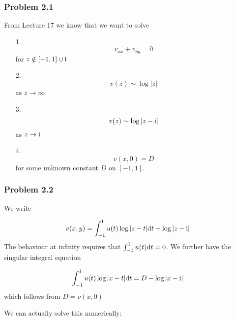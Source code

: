 \documentclass[12pt,a4paper]{article}
\def\D{ {\rm d} }
\def\I{ {\rm i} }
\def\dt{\D t}
\begin{document}
\subsubsection{Problem 2.1}
From Lecture 17 we know that we want to solve

\begin{itemize}
\item[1. ] \[
v_{xx} + v_{yy} =0
\]
for $z \notin [-1,1] \cup \I$


\item[2. ] \[
v(z) \sim \log|z|
\]
as $z \rightarrow \infty$


\item[3. ] \[
v(z) \sim \log|z-\I|
\]
as $z \rightarrow \I$


\item[4. ] \[
v(x,0) = D
\]
for some unknown constant $D$ on $[-1,1]$.

\end{itemize}
\subsubsection{Problem 2.2}
We write

\[
v(x,y) = \int_{-1}^1 u(t) \log|z-t| \dt + \log|z-\I|
\]
The behaviour at infinity requires that $\int_{-1}^1 u(t) \dt = 0$. We further have the singular integral equation

\[
  \int_{-1}^1 u(t) \log|x-t| \dt = D - \log|x-\I|
\]
which follows from $D = v(x,0)$

We can actually solve this numerically:
\end{document}
